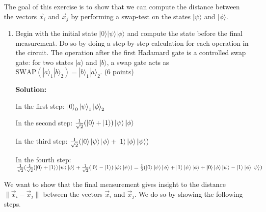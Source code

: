 \documentclass[12pt]{article}
\begin{document}
    The goal of this exercise is to show that we can compute the distance between the vectors $\vec{x}_i$ and $\vec{x}_j$ by performing a swap-test on the states $|\psi\rangle$ and $|\phi\rangle$.



    \begin{enumerate}[start=3]
        \item Begin with the initial state $|0\rangle|\psi\rangle|\phi\rangle$ and compute the state before the final measurement. Do so by doing a step-by-step calculation for each operation in the circuit. The operation after the first Hadamard gate is a controlled swap gate: for two states $|a\rangle$ and $|b\rangle$, a swap gate acts as $\text{SWAP}(|a\rangle_1|b\rangle_2) = |b\rangle_1|a\rangle_2$. (6 points)
    
        \textbf{Solution:}

        In the first step:
        $\ket{0}_0\ket{\psi}_1\ket{\phi}_2$

        In the second step:
        $\frac{1}{\sqrt{2}}(\ket{0}+\ket{1})\ket{\psi}\ket{\phi}$

        In the third step:
        $\frac{1}{\sqrt{2}}(\ket{0}\ket{\psi}\ket{\phi}+\ket{1}\ket{\phi}\ket{\psi})$

        In the fourth step:
        $\frac{1}{\sqrt{2}}(\frac{1}{\sqrt{2}}(\ket{0}+\ket{1})\ket{\psi}\ket{\phi}
        +\frac{1}{\sqrt{2}}(\ket{0}-\ket{1})\ket{\phi}\ket{\psi})
        \\=\frac{1}{2}(\ket{0}\ket{\psi}\ket{\phi}+\ket{1}\ket{\psi}\ket{\phi}
        +\ket{0}\ket{\phi}\ket{\psi}-\ket{1}\ket{\phi}\ket{\psi})
        $
        
    
    \end{enumerate}

        We want to show that the final measurement gives insight to the distance $\|\vec{x}_i - \vec{x}_j\|$ between the vectors $\vec{x}_i$ and $\vec{x}_j$.
    We do so by showing the following steps.
\end{document}
